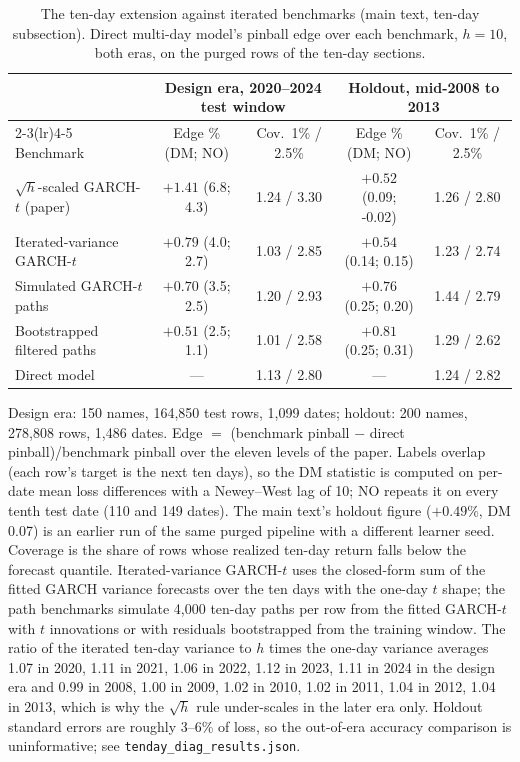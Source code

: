 \documentclass[11pt]{article}
\begin{document}
\begin{table}[htbp]
\centering
\begin{threeparttable}
\caption{The ten-day extension against iterated benchmarks (main text, ten-day subsection). Direct multi-day model's pinball edge over each benchmark, $h=10$, both eras, on the purged rows of the ten-day sections.}
\label{tab:tenday}
\scriptsize\setlength{\tabcolsep}{3pt}
\begin{tabular}{lcccc}
\toprule
& \multicolumn{2}{c}{Design era, 2020--2024 test window} & \multicolumn{2}{c}{Holdout, mid-2008 to 2013} \\
\cmidrule(lr){2-3}\cmidrule(lr){4-5}
Benchmark & Edge \% (DM; NO) & Cov.\ 1\% / 2.5\% & Edge \% (DM; NO) & Cov.\ 1\% / 2.5\% \\
\midrule
$\sqrt{h}$-scaled GARCH-$t$ (paper) & $+1.41$ (6.8; 4.3) & 1.24 / 3.30 & $+0.52$ (0.09; -0.02) & 1.26 / 2.80 \\
Iterated-variance GARCH-$t$ & $+0.79$ (4.0; 2.7) & 1.03 / 2.85 & $+0.54$ (0.14; 0.15) & 1.23 / 2.74 \\
Simulated GARCH-$t$ paths & $+0.70$ (3.5; 2.5) & 1.20 / 2.93 & $+0.76$ (0.25; 0.20) & 1.44 / 2.79 \\
Bootstrapped filtered paths & $+0.51$ (2.5; 1.1) & 1.01 / 2.58 & $+0.81$ (0.25; 0.31) & 1.29 / 2.62 \\
Direct model & --- & 1.13 / 2.80 & --- & 1.24 / 2.82 \\
\bottomrule
\end{tabular}
\begin{tablenotes}\footnotesize
\item Design era: 150 names, 164,850 test rows, 1,099 dates; holdout: 200 names, 278,808 rows, 1,486 dates. Edge $=$ (benchmark pinball $-$ direct pinball)/benchmark pinball over the eleven levels of the paper. Labels overlap (each row's target is the next ten days), so the DM statistic is computed on per-date mean loss differences with a Newey--West lag of 10; NO repeats it on every tenth test date (110 and 149 dates). The main text's holdout figure ($+0.49\%$, DM 0.07) is an earlier run of the same purged pipeline with a different learner seed. Coverage is the share of rows whose realized ten-day return falls below the forecast quantile. Iterated-variance GARCH-$t$ uses the closed-form sum of the fitted GARCH variance forecasts over the ten days with the one-day $t$ shape; the path benchmarks simulate 4,000 ten-day paths per row from the fitted GARCH-$t$ with $t$ innovations or with residuals bootstrapped from the training window. The ratio of the iterated ten-day variance to $h$ times the one-day variance averages 1.07 in 2020, 1.11 in 2021, 1.06 in 2022, 1.12 in 2023, 1.11 in 2024 in the design era and 0.99 in 2008, 1.00 in 2009, 1.02 in 2010, 1.02 in 2011, 1.04 in 2012, 1.04 in 2013, which is why the $\sqrt{h}$ rule under-scales in the later era only. Holdout standard errors are roughly 3--6\% of loss, so the out-of-era accuracy comparison is uninformative; see \texttt{tenday\_diag\_results.json}.
\end{tablenotes}
\end{threeparttable}
\end{table}
\end{document}
